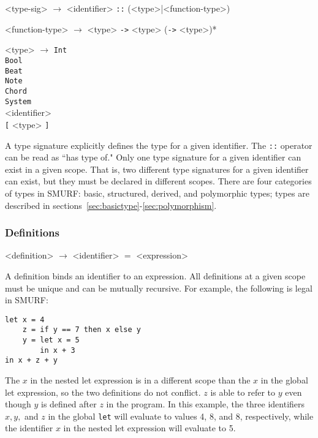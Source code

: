 \begin{grammar}

<type-sig> $\rightarrow$ <identifier> \texttt{::} (<type>|<function-type>)

<function-type> $\rightarrow$ <type> \texttt{->} <type> (\texttt{->} <type>)*

<type> $\rightarrow$ \texttt{Int} \\ \texttt{Bool} \\ \texttt{Beat} \\ \texttt{Note} \\
											\texttt{Chord} \\ \texttt{System} \\ <identifier> \\ 
											\texttt{[} <type> \texttt{]} \\ 
										

\end{grammar}

A type signature explicitly defines the type for a given identifier. The
\texttt{::} operator can be read as ``has type of." Only one type signature
for a given identifier can exist in a given scope. That is, two different
type signatures for a given identifier can exist, but they must be declared
in different scopes. There are four categories of types in SMURF: basic,  structured, derived, 
and polymorphic types; types are described in sections~\ref{sec:basictype}-\ref{sec:polymorphism}.

\subsubsection{Definitions}

\begin{grammar}

<definition> $\rightarrow$ <identifier> $=$ <expression>

\end{grammar}

A definition binds an identifier to an expression. All definitions at a given
scope must be unique and can be mutually recursive. For example, the following
is legal in SMURF:

\begin{verbatim}
let x = 4
  	z = if y == 7 then x else y
  	y = let x = 5 
        in x + 3 
in x + z + y
\end{verbatim}


The $x$ in the nested let expression is in a different scope than the $x$ in the global let expression, 
so the two definitions do not conflict. $z$ is able to refer to $y$ even though
$y$ is defined after $z$ in the program. In this example, the three 
identifiers $x, y, $ and $z$ in the global \texttt{let} will evaluate to values 4, 8, and 8, respectively,
while the identifier $x$ in the nested let expression will evaluate to 5.

